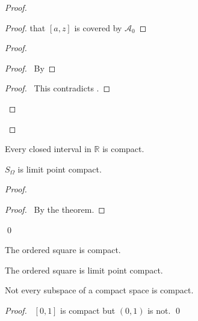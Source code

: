 \begin{proof}
\begin{proof}
{      that
      $[a, z]$ is covered by $\mathcal{A}_0$}
  \end{proof}
  \begin{proof}
    \step{<2>2}{\pick\ $y \in (c, b]$ such that $[c, y]$ is covered by at
      most
      two elements of $\mathcal{A}$.}
    \begin{proof}
      \pf\ By 
    \end{proof}
    \qedstep
    \begin{proof}
      \pf\ This contradicts .
    \end{proof}
  \end{proof}
  \qedstep
\end{proof}

\begin{cor}
  \label{cor:topology:compact:real_closed_interval}
  Every closed interval in $\mathbb{R}$ is compact.
\end{cor}

 \begin{cor}[CC]
   \label{cor:topology:limit_point_compact:S_omega}
$S_\Omega$ is limit point compact.
\end{cor}

\begin{proof}
\pf
{}
\begin{proof}
  \pf\ By the theorem.
\end{proof}
\qed
\end{proof}

\begin{cor}
The ordered square is compact.
\end{cor}

\begin{cor}
The ordered square is limit point compact.
\end{cor}

\begin{cor}
Not every subspace of a compact space is compact.
\end{cor}

\begin{proof}
\pf\ $[0,1]$ is compact but $(0,1)$ is not. \qed
\end{proof}

